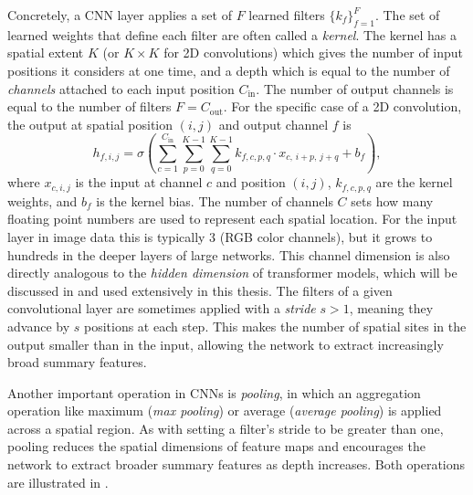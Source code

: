 Concretely, a CNN layer applies a set of $F$ learned filters $\{k_f\}_{f=1}^F$.
The set of learned weights that define each filter are often called a \textit{kernel}.
The kernel has a spatial extent $K$ (or $K \times K$ for 2D convolutions) which gives the number of input positions it considers at one time, and a depth which is equal to the number of \textit{channels} attached to each input position $C_{\text{in}}$.
The number of output channels is equal to the number of filters $F = C_{\text{out}}$.
For the specific case of a 2D convolution, the output at spatial position $(i, j)$ and output channel $f$ is
\begin{equation}
    h_{f,i,j} = \sigma\!\left( \sum_{c=1}^{C_{\text{in}}} \sum_{p=0}^{K-1} \sum_{q=0}^{K-1} k_{f,c,p,q} \cdot x_{c,\, i+p,\, j+q} + b_f \right),
    \label{eqn:conv2d}
\end{equation}
where $x_{c,i,j}$ is the input at channel $c$ and position $(i,j)$, $k_{f,c,p,q}$ are the kernel weights, and $b_f$ is the kernel bias.
The number of channels $C$ sets how many floating point numbers are used to represent each spatial location.
For the input layer in image data this is typically 3 (RGB color channels), but it grows to hundreds in the deeper layers of large networks.
This channel dimension is also directly analogous to the \textit{hidden dimension} of transformer models, which will be discussed in  and used extensively in this thesis.
The filters of a given convolutional layer are sometimes applied with a \textit{stride} $s > 1$, meaning they advance by $s$ positions at each step.
This makes the number of spatial sites in the output smaller than in the input, allowing the network to extract increasingly broad summary features.

Another important operation in CNNs is \textit{pooling}, in which an aggregation operation like maximum (\textit{max pooling}) or average (\textit{average pooling}) is applied across a spatial region.
As with setting a filter's stride to be greater than one, pooling reduces the spatial dimensions of feature maps and encourages the network to extract broader summary features as depth increases.
Both operations are illustrated in .

